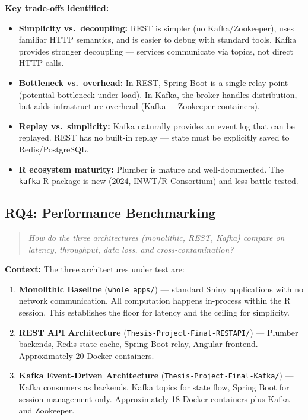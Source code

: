 \documentclass[12pt,a4paper]{article}
\begin{document}
\textbf{Key trade-offs identified:}

\begin{itemize}[nosep]
  \item \textbf{Simplicity vs.\ decoupling:} REST is simpler (no Kafka/Zookeeper), uses familiar HTTP semantics, and is easier to debug with standard tools. Kafka provides stronger decoupling --- services communicate via topics, not direct HTTP calls.
  \item \textbf{Bottleneck vs.\ overhead:} In REST, Spring Boot is a single relay point (potential bottleneck under load). In Kafka, the broker handles distribution, but adds infrastructure overhead (Kafka + Zookeeper containers).
  \item \textbf{Replay vs.\ simplicity:} Kafka naturally provides an event log that can be replayed. REST has no built-in replay --- state must be explicitly saved to Redis/PostgreSQL.
  \item \textbf{R ecosystem maturity:} Plumber is mature and well-documented. The \texttt{kafka} R package is new (2024, INWT/R Consortium) and less battle-tested.
\end{itemize}

\subsection{RQ4: Performance Benchmarking}

\begin{quote}
\textit{How do the three architectures (monolithic, REST, Kafka) compare on latency, throughput, data loss, and cross-contamination?}
\end{quote}

\textbf{Context:} The three architectures under test are:

\begin{enumerate}[nosep]
  \item \textbf{Monolithic Baseline} (\texttt{whole\_apps/}) --- standard Shiny applications with no network communication. All computation happens in-process within the R session. This establishes the floor for latency and the ceiling for simplicity.
  \item \textbf{REST API Architecture} (\texttt{Thesis-Project-Final-RESTAPI/}) --- Plumber backends, Redis state cache, Spring Boot relay, Angular frontend. Approximately 20 Docker containers.
  \item \textbf{Kafka Event-Driven Architecture} (\texttt{Thesis-Project-Final-Kafka/}) --- Kafka consumers as backends, Kafka topics for state flow, Spring Boot for session management only. Approximately 18 Docker containers plus Kafka and Zookeeper.
\end{enumerate}
\end{document}
